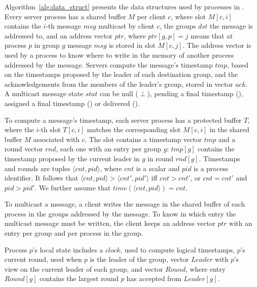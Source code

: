 Algorithm~\ref{alg:data_struct} presents the data structures used by processes in \libname.
Every server process has a shared buffer $M$ per client $c$, where slot $M[c,i]$ contains the $i$-th message $msg$ multicast by client $c$, the groups $dst$ the message is addressed to, and an address vector $ptr$, where $ptr[g,p]=j$ means that at process $p$ in group $g$ message $msg$ is stored in slot $M[c,j]$. 
The address vector is used by a process to know where to write in the memory of another process addressed by the message.
Servers compute the message's timestamp $tmp$, based on the timestamps proposed by the leader of each destination group, and the acknowledgements from the members of the leader's group, stored in vector $ack$.
A multicast message state $stat$ can be null ($\perp$), pending a final timestamp (\mcast), assigned a final timestamp (\ordered) or delivered (\done).

To compute a message's timestamp, each server process has a protected buffer $T$, where the $i$-th slot $T[c,i]$ matches the corresponding slot $M[c,i]$ in the shared buffer $M$ associated with $c$.
The slot contains a timestamp vector $tmp$ and a round vector $rnd$, each one with an entry per group $g$: $tmp[g]$ contains the timestamp proposed by the current leader in $g$ in round $rnd[g]$.
Timestamps and rounds are tuples $\langle cnt,pid \rangle$, where $cnt$ is a scalar and $pid$ is a process identifier. 
It follows that $\langle cnt,pid \rangle > \langle cnt',pid' \rangle$ iff $cnt > cnt'$, or $cnt = cnt'$ and $pid > pid'$.
We further assume that $time(\langle cnt,pid \rangle)=cnt$.

To multicast a message, a client writes the message in the shared buffer of each process in the groups addressed by the message.
To know in which entry the multicast message must be written, the client keeps an address vector $ptr$ with an entry per group and per process in the group.

Process $p$'s local state includes a $clock$, used to compute logical timestamps, $p$'s current round, used when $p$ is the leader of the group, vector $Leader$ with $p$'s view on the current leader of each group, and vector $Round$, where entry $Round[g]$ contains the largest round $p$ has accepted from $Leader[g]$.











